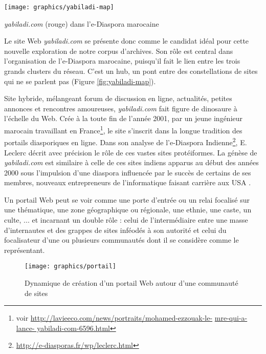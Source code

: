 \documentclass[symmetric,justified,marginals=raggedouter]{tufte-book}
\begin{document}
\begin{marginfigure}%
  \texttt{[image: graphics/yabiladi-map]}
  \vspace*{0.2cm}  
  \caption{\textit{yabiladi.com} (rouge) dans l'e-Diaspora marocaine}
  \label{fig:yabiladi-map}
\end{marginfigure} 

\noindent Le site Web \textit{yabiladi.com} se présente donc comme le candidat idéal pour cette nouvelle exploration de notre corpus d'archives.  Son rôle est central dans l'organisation de l'e-Diaspora marocaine, puisqu'il fait le lien entre les trois grands clusters du réseau. C'est un hub, un pont entre des constellations de sites qui ne se parlent pas (Figure \ref{fig:yabiladi-map}).

Site hybride, mélangeant forum de discussion en ligne, actualités, petites annonces et rencontres amoureuses, \textit{yabiladi.com} fait figure de dinosaure à l'échelle du Web. Crée à la toute fin de l'année 2001, par un jeune ingénieur marocain travaillant en France\footnote{voir \url{http://lavieeco.com/news/portraits/mohamed-ezzouak-le-} \url{mre-qui-a-lance-
yabiladi-com-6596.html}}, le site s'inscrit dans la longue tradition des portails diasporiques en ligne. Dans son analyse de l'e-Diaspora Indienne\footnote{\url{http://e-diasporas.fr/wp/leclerc.html}}, E. Leclerc décrit avec précision le rôle de ces vastes sites protéiformes. La génèse de \textit{yabiladi.com} est similaire à celle de ces sites indiens apparus au début des années 2000 sous l'impulsion d'une diaspora influencée par le succès de certains de ses membres, nouveaux entrepreneurs de l'informatique faisant carrière aux USA \citep{leclerc_cyberespace_2012}. 

Un portail Web peut se voir comme une porte d'entrée ou un relai focalisé sur une thématique, une zone géographique ou régionale, une ethnie, une caste, un culte, ... et incarnant un double rôle : celui de l'intermédiaire entre une masse d'internautes et des grappes de sites inféodés à son autorité et celui du focalisateur d'une ou plusieurs communautés dont il se considère comme le représentant. 

\begin{figure*}
  \texttt{[image: graphics/portail]}
  \caption{Dynamique de création d'un portail Web autour d'une communauté de sites}
  \label{fig:portail}
\end{figure*}
\end{document}
